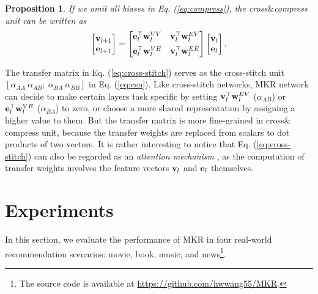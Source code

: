 \documentclass[sigconf]{acmart}
\newtheorem{proposition}{Proposition}
\begin{document}
		\begin{proposition}
		\label{prop:3}
			If we omit all biases in Eq. (\ref{eq:compress}), the cross$\&$compress unit can be written as
			\begin{equation}
			\label{eq:cross-stitch}
				\begin{bmatrix}
   				{\bf v}_{l+1}\\
   				{\bf e}_{l+1}
  			\end{bmatrix}
  			=
  			\begin{bmatrix}
   				{\bf e}_l^\top {\bf w}_l^{VV} & {\bf v}_l^\top {\bf w}_l^{EV}\\[5pt]
   				{\bf e}_l^\top {\bf w}_l^{VE} & {\bf v}_l^\top {\bf w}_l^{EE}
  			\end{bmatrix}
  			\begin{bmatrix}
   				{\bf v}_l\\
   				{\bf e}_l
  			\end{bmatrix}.
			\end{equation}
		\end{proposition}
		
		The transfer matrix in Eq. (\ref{eq:cross-stitch}) serves as the cross-stitch unit $[\alpha_{AA} \ \alpha_{AB}; \ \alpha_{BA} \ \alpha_{BB}]$ in Eq. (\ref{eq:csn}).
		Like cross-stitch networks, MKR network can decide to make certain layers task specific by setting ${\bf v}_l^\top {\bf w}_l^{EV}$ ($\alpha_{AB}$) or ${\bf e}_l^\top {\bf w}_l^{VE}$ ($\alpha_{BA}$) to zero, or choose a more shared representation by assigning a higher value to them.
		But the transfer matrix is more fine-grained in cross$\&$compress unit, because the transfer weights are replaced from scalars to dot products of two vectors.
		It is rather interesting to notice that Eq. (\ref{eq:cross-stitch}) can also be regarded as an \textit{attention mechanism} \cite{bahdanau2014neural}, as the computation of transfer weights involves the feature vectors ${\bf v}_l$ and ${\bf e}_l$ themselves.



\section{Experiments}
	In this section, we evaluate the performance of MKR in four real-world recommendation scenarios: movie, book, music, and news\footnote{The source code is available at \url{https://github.com/hwwang55/MKR}.}.
	
\end{document}
